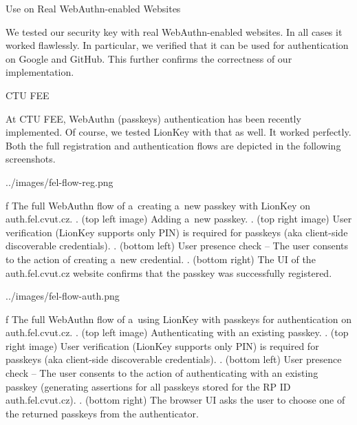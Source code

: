 \sec Use on Real WebAuthn-enabled Websites

We tested our security key with real WebAuthn-enabled websites. In all cases it worked flawlessly. In particular, we verified that it can be used for authentication on {\sbf Google} and {\sbf GitHub}. This further confirms the correctness of our implementation.


\secc CTU FEE

At CTU FEE, WebAuthn (passkeys) authentication has been recently implemented. Of course, we tested LionKey with that as well. It worked perfectly. Both the full registration and authentication flows are depicted in the following screenshots.

\midinsert
{}
\picw=144mm \cinspic ../images/fel-flow-reg.png
\caption/f The full WebAuthn flow of a~creating a~new passkey with LionKey on auth.fel.cvut.cz. {.} (top left image) Adding a~new passkey. {.} (top right image) User verification (LionKey supports only PIN) is required for passkeys (aka client-side discoverable credentials). {.} (bottom left) User presence check – The user consents to the action of creating a~new credential. {.} (bottom right) The UI of the auth.fel.cvut.cz website confirms that the passkey was successfully registered.
\endinsert


\midinsert
{}
\picw=144mm \cinspic ../images/fel-flow-auth.png
\caption/f The full WebAuthn flow of a~using LionKey with passkeys for authentication on auth.fel.cvut.cz. {.} (top left image) Authenticating with an existing passkey. {.} (top right image) User verification (LionKey supports only PIN) is required for passkeys (aka client-side discoverable credentials). {.} (bottom left) User presence check – The user consents to the action of authenticating with an existing passkey (generating assertions for all passkeys stored for the RP ID auth.fel.cvut.cz). {.} (bottom right) The browser UI asks the user to choose one of the returned passkeys from the authenticator.
\endinsert
